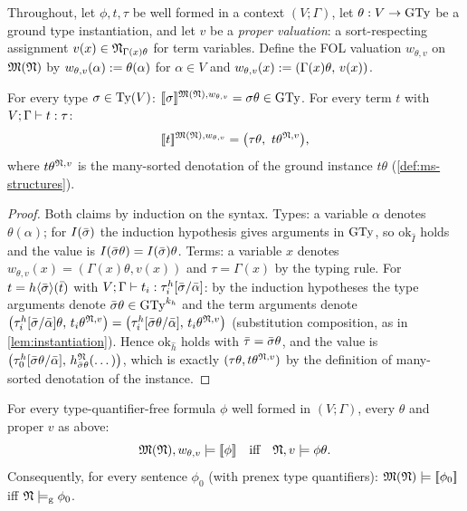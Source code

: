 Throughout, let $\phi, t, \tau$ be well formed in a context $(V;\Gamma)$,
let $\theta : V \rightarrow \mathrm{GTy}$ be a ground type instantiation, and let $v$ be a
\emph{proper valuation}: a sort-respecting assignment
$v(x) \in \mathfrak{N}_{\Gamma(x)\theta}$ for term variables.  Define the FOL
valuation $w_{\theta,v}$ on $\mathfrak{M}(\mathfrak{N})$ by
$w_{\theta,v}(\alpha) \mathrel{:=} \theta(\alpha)$ for $\alpha \in V$ and
$w_{\theta,v}(x) \mathrel{:=} (\Gamma(x)\theta,\, v(x))$.

\begin{lemma}[Denotation]
  \label{lem:denotation}
  For every type $\sigma \in \mathrm{Ty}(V)$:
  $[\![ \sigma ]\!]^{\mathfrak{M}(\mathfrak{N}), w_{\theta,v}} = \sigma\theta \in \mathrm{GTy}$.
  For every term $t$ with $V;\Gamma\vdash t : \tau$:
  \[
    [\![ t ]\!]^{\mathfrak{M}(\mathfrak{N}), w_{\theta,v}} =
    \bigl(\tau\theta,\ t\theta^{\mathfrak{N}, v}\bigr),
  \]
  where $t\theta^{\mathfrak{N},v}$ is the many-sorted denotation of the ground
  instance $t\theta$ (\cref{def:ms-structures}).
\end{lemma}

\begin{proof}
  Both claims by induction on the syntax.  Types: a variable $\alpha$
  denotes $\theta(\alpha)$; for $I(\bar{\sigma})$ the induction hypothesis
  gives arguments in $\mathrm{GTy}$, so $\mathrm{ok}_{\hat I}$ holds and the value
  is $I(\bar{\sigma}\theta) = I(\bar{\sigma})\theta$.  Terms: a variable $x$
  denotes $w_{\theta,v}(x) = (\Gamma(x)\theta, v(x))$ and
  $\tau = \Gamma(x)$ by the typing rule.  For
  $t = h\langle\bar{\sigma}\rangle(\bar{t})$ with
  $V;\Gamma\vdash t_i : \tau^h_i[\bar{\sigma}/\bar{\alpha}]$: by the
  induction hypotheses the type arguments denote
  $\bar{\sigma}\theta \in \mathrm{GTy}^{k_h}$ and the term arguments denote
  $\bigl(\tau^h_i[\bar{\sigma}/\bar{\alpha}]\theta,\,
  t_i\theta^{\mathfrak{N},v}\bigr) =
  \bigl(\tau^h_i[\bar{\sigma}\theta/\bar{\alpha}],\,
  t_i\theta^{\mathfrak{N},v}\bigr)$ (substitution composition, as in
  \cref{lem:instantiation}).  Hence $\mathrm{ok}_{\hat h}$ holds with
  $\bar{\tau} = \bar{\sigma}\theta$, and the value is
  $\bigl(\tau^h_0[\bar{\sigma}\theta/\bar{\alpha}],\,
  h^{\mathfrak{N}}_{\bar{\sigma}\theta}(\dots)\bigr)$, which is exactly
  $(\tau\theta, t\theta^{\mathfrak{N},v})$ by the definition of many-sorted
  denotation of the instance.
\end{proof}

\begin{lemma}[Relativization]
  \label{lem:relativization}
  For every type-quantifier-free formula $\phi$ well formed in
  $(V;\Gamma)$, every $\theta$ and proper $v$ as above:
  \[
    \mathfrak{M}(\mathfrak{N}), w_{\theta,v} \models [\![ \phi ]\!]
    \quad\text{iff}\quad
    \mathfrak{N}, v \models \phi\theta .
  \]
  Consequently, for every sentence $\phi_0$ (with prenex type
  quantifiers): $\mathfrak{M}(\mathfrak{N}) \models [\![ \phi_0 ]\!]$ iff $\mathfrak{N} \models_{\mathrm{g}} \phi_0$.
\end{lemma}

